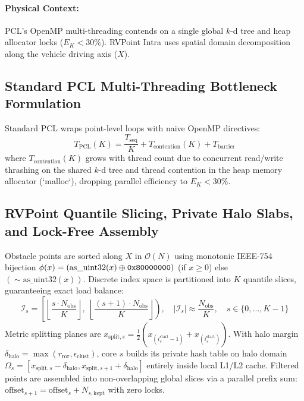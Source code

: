 \documentclass[11pt,a4paper]{article}
\begin{document}
\paragraph{Physical Context:} PCL's OpenMP multi-threading contends on a single global $k$-d tree and heap allocator locks ($E_K < 30\%$). RVPoint Intra uses spatial domain decomposition along the vehicle driving axis ($X$).

\subsection{Standard PCL Multi-Threading Bottleneck Formulation}
Standard PCL wraps point-level loops with naive OpenMP directives:
\begin{equation}
T_{\text{PCL}}(K) = \frac{T_{\text{seq}}}{K} + T_{\text{contention}}(K) + T_{\text{barrier}}
\label{eq:pcl_openmp_math}
\end{equation}
where $T_{\text{contention}}(K)$ grows with thread count due to concurrent read/write thrashing on the shared $k$-d tree and thread contention in the heap memory allocator (`malloc`), dropping parallel efficiency to $E_K < 30\%$.

\subsection{RVPoint Quantile Slicing, Private Halo Slabs, and Lock-Free Assembly}
Obstacle points are sorted along $X$ in $\mathcal{O}(N)$ using monotonic IEEE-754 bijection $\phi(x) = (\text{as\_uint32}(x) \oplus \text{\texttt{0x80000000}})$ (if $x \ge 0$) else $(\sim\text{as\_uint32}(x))$. Discrete index space is partitioned into $K$ quantile slices, guaranteeing exact load balance:
\begin{equation}
\mathcal{I}_s = \left[ \left\lfloor \frac{s \cdot N_{\text{obs}}}{K} \right\rfloor, \; \left\lfloor \frac{(s + 1) \cdot N_{\text{obs}}}{K} \right\rfloor \right), \quad |\mathcal{I}_s| \approx \frac{N_{\text{obs}}}{K}, \quad s \in \{0, \dots, K-1\}
\end{equation}
Metric splitting planes are $x_{\text{split}, s} = \frac{1}{2}(x_{(i_s^{\text{start}}-1)} + x_{(i_s^{\text{start}})})$. With halo margin $\delta_{\text{halo}} = \max(r_{\text{ror}}, \epsilon_{\text{clust}})$, core $s$ builds its private hash table on halo domain $\Omega_s = [x_{\text{split}, s} - \delta_{\text{halo}}, x_{\text{split}, s+1} + \delta_{\text{halo}}]$ entirely inside local L1/L2 cache. Filtered points are assembled into non-overlapping global slices via a parallel prefix sum: $\text{offset}_{s+1} = \text{offset}_s + N_{s, \text{kept}}$ with zero locks.
\end{document}

